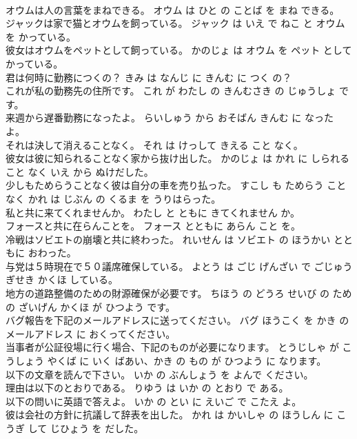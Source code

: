 \documentclass[8pt]{extreport}
\begin{document}
\begin{CJK}{UTF8}{min}
\\	オウムは人の言葉をまねできる。	オウム は ひと の ことば を まね できる。	
\\	ジャックは家で猫とオウムを飼っている。	ジャック は いえ で ねこ と オウム を かっている。	
\\	彼女はオウムをペットとして飼っている。	かのじょ は オウム を ペット として かっている。	
\\	君は何時に勤務につくの？	きみ は なんじ に きんむ に つく の？	
\\	これが私の勤務先の住所です。	これ が わたし の きんむさき の じゅうしょ です。	
\\	来週から遅番勤務になったよ。	らいしゅう から おそばん きんむ に なった よ。	
\\	それは決して消えることなく。	それ は けっして きえる こと なく。	
\\	彼女は彼に知られることなく家から抜け出した。	かのじょ は かれ に しられる こと なく いえ から ぬけだした。	
\\	少しもためらうことなく彼は自分の車を売り払った。	すこし も ためらう こと なく かれ は じぶん の くるま を うりはらった。	
\\	私と共に来てくれませんか。	わたし と ともに きてくれません か。	
\\	フォースと共に在らんことを。	フォース とともに あらん こと を。	
\\	冷戦はソビエトの崩壊と共に終わった。	れいせん は ソビエト の ほうかい とともに おわった。	
\\	与党は５時現在で５０議席確保している。	よとう は ごじ げんざい で ごじゅう ぎせき かくほ している。	
\\	地方の道路整備のための財源確保が必要です。	ちほう の どうろ せいび の ため の ざいげん かくほ が ひつよう です。	
\\	バグ報告を下記のメールアドレスに送ってください。	バグ ほうこく を かき の メールアドレス に おくってください。	
\\	当事者が公証役場に行く場合、下記のものが必要になります。	とうじしゃ が こうしょう やくば に いく ばあい、かき の もの が ひつよう に なります。	
\\	以下の文章を読んで下さい。	いか の ぶんしょう を よんで ください。	
\\	理由は以下のとおりである。	りゆう は いか の とおり で ある。	
\\	以下の問いに英語で答えよ。	いか の とい に えいご で こたえ よ。	
\\	彼は会社の方針に抗議して辞表を出した。	かれ は かいしゃ の ほうしん に こうぎ して じひょう を だした。	

\end{CJK}
\end{document}
